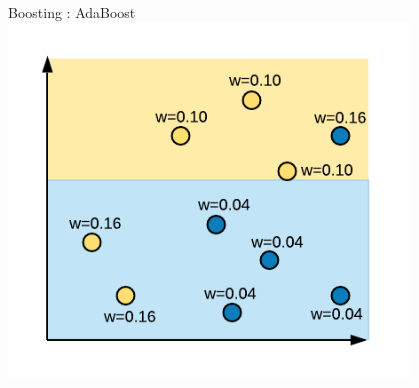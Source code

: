 \documentclass[aspectratio=169,10pt]{beamer}
\newcommand{\fitpic}[1]{\begin{adjustbox}{max width=\linewidth, max totalheight=0.78\textheight}#1\end{adjustbox}}
\begin{document}
\begin{frame}{Boosting : AdaBoost }
  \centering
  \fitpic{\includegraphics[width=0.8\textwidth]{../assets/ensemble/diagrams/ada_iter2_new_weights_normalized}}
\end{frame}
\end{document}
